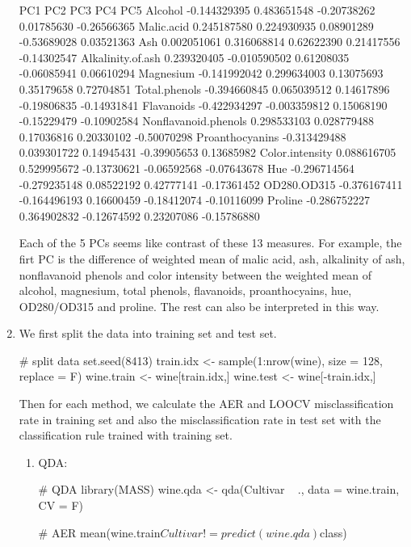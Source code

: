 \documentclass{article}
\begin{document}
\begin{enumerate}[leftmargin = 0 em, label = \arabic*., font = \bfseries]
\begin{rcode}
                              PC1          PC2         PC3         PC4         PC5
Alcohol              -0.144329395  0.483651548 -0.20738262  0.01785630 -0.26566365
Malic.acid            0.245187580  0.224930935  0.08901289 -0.53689028  0.03521363
Ash                   0.002051061  0.316068814  0.62622390  0.21417556 -0.14302547
Alkalinity.of.ash     0.239320405 -0.010590502  0.61208035 -0.06085941  0.06610294
Magnesium            -0.141992042  0.299634003  0.13075693  0.35179658  0.72704851
Total.phenols        -0.394660845  0.065039512  0.14617896 -0.19806835 -0.14931841
Flavanoids           -0.422934297 -0.003359812  0.15068190 -0.15229479 -0.10902584
Nonflavanoid.phenols  0.298533103  0.028779488  0.17036816  0.20330102 -0.50070298
Proanthocyanins      -0.313429488  0.039301722  0.14945431 -0.39905653  0.13685982
Color.intensity       0.088616705  0.529995672 -0.13730621 -0.06592568 -0.07643678
Hue                  -0.296714564 -0.279235148  0.08522192  0.42777141 -0.17361452
OD280.OD315          -0.376167411 -0.164496193  0.16600459 -0.18412074 -0.10116099
Proline              -0.286752227  0.364902832 -0.12674592  0.23207086 -0.15786880
\end{rcode}

Each of the 5 PCs seems like contrast of these 13 measures. For example, the firt PC is the difference of weighted mean of malic acid, ash, alkalinity of ash, nonflavanoid phenols and color intensity between the weighted mean of alcohol, magnesium, total phenols, flavanoids, proanthocyains, hue, OD280/OD315 and proline. The rest can also be interpreted in this way.


 \item 
 We first split the data into training set and test set.
 \begin{rcode}
 # split data
set.seed(8413)
train.idx <- sample(1:nrow(wine), size = 128, replace = F)
wine.train <- wine[train.idx,]
wine.test <- wine[-train.idx,]
  \end{rcode} 

  Then for each method, we calculate the AER and LOOCV misclassification rate in training set and also the misclassification rate in test set with the classification rule trained with training set.

\begin{enumerate}
	\item
	QDA:
\begin{rcode}
# QDA
library(MASS)
wine.qda <- qda(Cultivar ~ ., data = wine.train, CV = F)

# AER
mean(wine.train$Cultivar!=predict(wine.qda)$class) 


\end{rcode}
\end{enumerate}
\end{enumerate}
\end{document}
